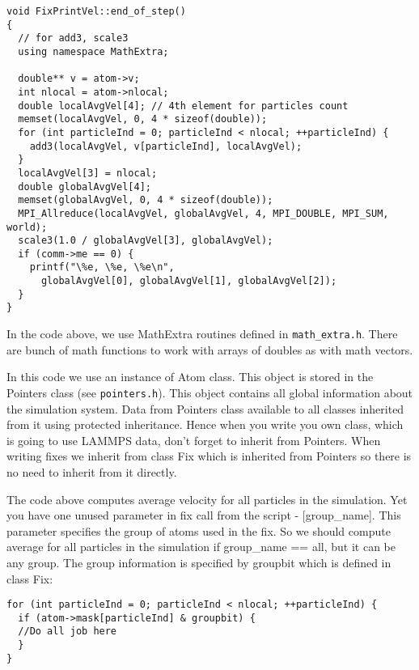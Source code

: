 \documentclass{article}
\newcommand{\path}[1]{\colorbox{light-gray}{\texttt{#1}}}
\begin{document}
\begin{center}
\begin{verbatim}
void FixPrintVel::end_of_step()
{
  // for add3, scale3
  using namespace MathExtra;

  double** v = atom->v;
  int nlocal = atom->nlocal;
  double localAvgVel[4]; // 4th element for particles count
  memset(localAvgVel, 0, 4 * sizeof(double));
  for (int particleInd = 0; particleInd < nlocal; ++particleInd) {
    add3(localAvgVel, v[particleInd], localAvgVel);
  }
  localAvgVel[3] = nlocal;
  double globalAvgVel[4];
  memset(globalAvgVel, 0, 4 * sizeof(double));
  MPI_Allreduce(localAvgVel, globalAvgVel, 4, MPI_DOUBLE, MPI_SUM, world);
  scale3(1.0 / globalAvgVel[3], globalAvgVel);
  if (comm->me == 0) {
    printf("\%e, \%e, \%e\n",
      globalAvgVel[0], globalAvgVel[1], globalAvgVel[2]);
  }
}
\end{verbatim}
\end{center}

In the code above, we use MathExtra routines defined in
\path{math\_extra.h}.  There are bunch of math functions to work with
arrays of doubles as with math vectors.

In this code we use an instance of Atom class. This object is stored
in the Pointers class (see \path{pointers.h}). This object contains all
global information about the simulation system. Data from Pointers
class available to all classes inherited from it using protected
inheritance. Hence when you write you own class, which is going to use
LAMMPS data, don't forget to inherit from Pointers.  When writing
fixes we inherit from class Fix which is inherited from Pointers so
there is no need to inherit from it directly.

The code above computes average velocity for all particles in the
simulation.  Yet you have one unused parameter in fix call from the
script - [group\_name].  This parameter specifies the group of atoms
used in the fix. So we should compute average for all particles in the
simulation if group\_name == all, but it can be any group. The group
information is specified by groupbit which is defined in class Fix:

\begin{center}
\begin{verbatim}
for (int particleInd = 0; particleInd < nlocal; ++particleInd) {
  if (atom->mask[particleInd] & groupbit) {
  //Do all job here
  }
}
\end{verbatim}
\end{center}
\end{document}

